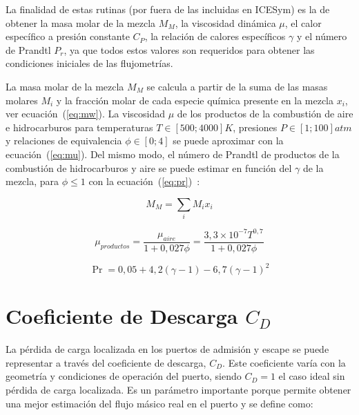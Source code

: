 La finalidad de estas rutinas (por fuera de las incluidas en ICESym) es la de
obtener la masa molar de la mezcla $M_{M}$, la viscosidad dinámica $\mu$, el
calor específico a presión constante $C_{P}$, la relación de calores
específicos $\gamma$ y el número de Prandtl $P_{r}$, ya que todos estos valores
son requeridos para obtener las condiciones iniciales de las flujometrías.

La masa molar de la mezcla $M_{M}$ se calcula a partir de la suma de las masas
molares $M_{i}$ y la fracción molar de cada especie química presente en la
mezcla $x_{i}$, ver ecuación~(\ref{eq:mw}).
%
La viscosidad $\mu$ de los productos de la combustión de aire e hidrocarburos
para temperaturas $T\in [500; 4000]K$, presiones $P\in[1; 100]atm$ y relaciones
de equivalencia $\phi \in [0;4]$ se puede aproximar con la
ecuación~(\ref{eq:mu}).
%
Del mismo modo, el número de Prandtl de productos de la combustión de
hidrocarburos y aire se puede estimar en función del $\gamma$ de la mezcla,
para $\phi\leq 1$ con la ecuación~(\ref{eq:pr})~\parencite{heywood}:


\begin{equation}\label{eq:mw}
  M_{M} = \sum_{i} M_{i}x_{i}
\end{equation}

\begin{equation}\label{eq:mu}
  \mu_{productos} = \frac{\mu_{aire}} {1 + 0,027 \phi} = \frac{3,3\times 10^{-7} T^{0,7}} {1 + 0,027 \phi}
\end{equation}

\begin{equation}\label{eq:pr}
    \Pr = 0,05 + 4,2 (\gamma - 1) - 6,7 {(\gamma - 1)}^{2}
\end{equation}


\section{Coeficiente de Descarga $C_{D}$}\label{subsec:cap2_cd}
%
La pérdida de carga localizada en los puertos de admisión y escape se puede
representar a través del coeficiente de descarga, $C_{D}$.
%
Este coeficiente varía con la geometría y condiciones de operación del puerto,
siendo $C_{D}=1$ el caso ideal sin pérdida de carga localizada.
%
Es un parámetro importante porque permite obtener una mejor estimación del flujo
másico real en el puerto y se define como:

